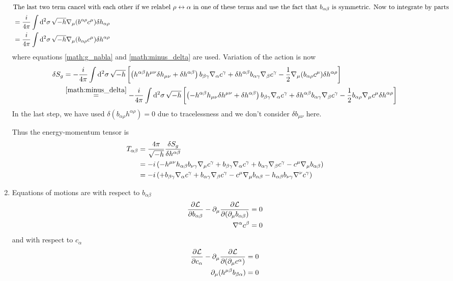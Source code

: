 \begin{enumerate}[label=(\alph*)]
\begin{align*}
			\shortintertext{The last two term cancel with each other if we relabel $\rho \leftrightarrow \alpha$ in one of these terms and use the fact that $b_{\alpha\beta}$ is symmetric. Now to integrate by parts}
			&= \frac{i}{4\pi} \int \dd[2]{\sigma} \sqrt{-h}  \nabla_\mu (b^{\alpha \rho} c^\mu)  \delta h_{\alpha \rho}  \\
			&= \frac{i}{4\pi} \int \dd[2]{\sigma} \sqrt{-h} \nabla_\mu (b_{\alpha \rho} c^\mu ) \delta h^{\alpha\rho}
		\end{align*}
		where equations \eqref{math:g_nabla} and \eqref{math:minus_delta} are used.
		Variation of the action is now
		\begin{align*}
			\delta S_g &= - \frac{i}{4\pi} \int \dd[2]{\sigma} \sqrt{-h} \left[ \left( h^{\alpha\beta} h^{\mu\nu} \delta h_{\mu\nu} + \delta h^{\alpha\beta} \right) b_{\beta\gamma} \nabla_\alpha c^\gamma + \delta h^{\alpha\beta} b_{\alpha\gamma } \nabla_\beta c^\gamma- \frac{1}{2}\nabla_\mu (b_{\alpha\rho}c^\mu)\delta h^{\alpha\rho} \right] \\
						  &\stackrel{\ref{math:minus_delta}}{=}- \frac{i}{4\pi} \int \dd[2]{\sigma} \sqrt{-h} \left[ \left( -h^{\alpha\beta} h_{\mu\nu} \delta h^{\mu\nu} + \delta h^{\alpha\beta} \right) b_{\beta\gamma} \nabla_\alpha c^\gamma + \delta h^{\alpha\beta} b_{\alpha\gamma } \nabla_\beta c^\gamma- \frac{1}{2} b_{\alpha\rho} \nabla_\mu c^\mu \delta h^{\alpha\rho} \right]
		\end{align*}
		In the last step, we have used $\delta (b_{\alpha\rho} h^{\alpha \rho}) = 0$ due to tracelessness and we don't consider $\delta b_{\mu\nu}$ here.

		Thus the energy-momentum tensor is
		\begin{align}
			T_{\alpha\beta} &= \frac{4\pi}{\sqrt{-h}} \frac{\delta S_g}{\delta h^{\alpha\beta}} \notag \\
								 &= -i \left( -h^{\mu\nu} h_{\alpha\beta} b_{\nu \gamma} \nabla_{\mu}c^\gamma + b_{\beta \gamma} \nabla_\alpha c^\gamma + b_{\alpha \gamma} \nabla_\beta c^\gamma- c^\mu \nabla_\mu b_{\alpha\beta} \right) \notag  \\
								 &= -i \left(  + b_{\beta \gamma} \nabla_\alpha c^\gamma + b_{\alpha \gamma} \nabla_\beta c^\gamma- c^\mu \nabla_\mu b_{\alpha\beta} - h_{\alpha\beta} b_{\nu \gamma} \nabla^{\nu}c^\gamma\right)
		\end{align}

	\item Equations of motions are with respect to $b_{\alpha\beta}$
		\begin{align}
			\pdv{\mathcal{L}}{b_{\alpha\beta}} - \partial_\mu \pdv{\mathcal{L}}{(\partial_\mu b_{\alpha\beta})} &= 0 \notag \\
			\nabla^\alpha c^\beta &= 0 \label{math:eom_c}
		\end{align}
		and with respect to $c_\alpha$
		\begin{align}
			\pdv{\mathcal{L}}{c_{\alpha}} - \partial_\mu \pdv{\mathcal{L}}{(\partial_\mu c^{\alpha})} &= 0 \notag \\
			\partial_\mu (h^{\mu\beta} b_{\beta \alpha}) &= 0 \label{math:eom_b}
		\end{align}
		

\end{enumerate}
